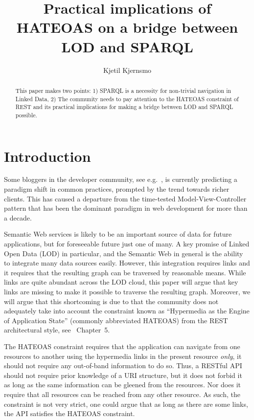 \documentclass{llncs}
\title{Practical implications of HATEOAS on a bridge between LOD and SPARQL}
\author{Kjetil Kjernsmo\inst{1}}
\institute{Department of Informatics,
Postboks 1080 Blindern,
0316 Oslo, Norway
\email{kjekje@ifi.uio.no}}
\begin{document}
\maketitle



\begin{abstract}
This paper makes two points: 1) SPARQL is a necessity for non-trivial
navigation in Linked Data, 2) The community needs to pay attention to
the HATEOAS constraint of REST and its practical implications for
making a bridge between LOD and SPARQL possible.


\end{abstract}

\section{Introduction}

Some bloggers in the developer community, see e.g.~\cite{sunsetonmvc},
is currently predicting a paradigm shift in common practices, prompted
by the trend towards richer clients. This has caused a departure from
the time-tested Model-View-Controller pattern that has been the
dominant paradigm in web development for more than a decade.

Semantic Web services is likely to be an important source of data for
future applications, but for foreseeable future just one of many. A
key promise of Linked Open Data (LOD) in particular, and the Semantic
Web in general is the ability to integrate many data sources
easily. However, this integration requires links and it requires that
the resulting graph can be traversed by reasonable means. While links
are quite abundant across the LOD cloud, this paper will argue that
key links are missing to make it possible to traverse the resulting
graph. Moreover, we will argue that this shortcoming is due to that
the community does not adequately take into account the constraint
known as ``Hypermedia as the Engine of Application State'' (commonly
abbreviated HATEOAS) from the REST architectural style, see
\cite{fielding}~Chapter~5.

The HATEOAS constraint requires that the application can navigate from
one resources to another using the hypermedia links in the present
resource \emph{only}, it should not require any out-of-band
information to do so. Thus, a RESTful API should not require prior
knowledge of a URI structure, but it does not forbid it as long as the
same information can be gleened from the resources. Nor does it
require that all resources can be reached from any other resource. As
such, the constraint is not very strict, one could argue that as long
as there are some links, the API satisfies the HATEOAS constraint.
\end{document}
